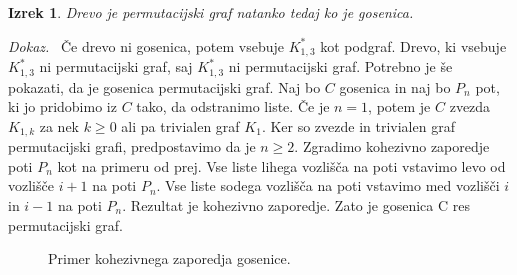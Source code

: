 \documentclass[a4paper, 12pt]{book}
\newtheorem{izrek}{Izrek}[chapter]
\newenvironment{dokaz}{\emph{Dokaz.}\ }{\hspace{\fill}{$\Box$}}
\begin{document}
\begin{izrek}
\label{izrek_gosenica_permutacijski_graf}
    Drevo je permutacijski graf natanko tedaj ko je gosenica.
\end{izrek}
\begin{dokaz}
    Če drevo ni gosenica, potem vsebuje $K_{1,3}^*$ kot podgraf. Drevo, ki vsebuje $K_{1,3}^*$ ni permutacijski graf, saj $K_{1,3}^*$ ni permutacijski graf. Potrebno je še pokazati, da je gosenica permutacijski graf. Naj bo $C$ gosenica in naj bo $P_n$ pot, ki jo pridobimo iz $C$ tako, da odstranimo liste. Če je $n=1$, potem je $C$ zvezda $K_{1,k}$ za nek $k \geq 0$ ali pa trivialen graf $K_1$. Ker so zvezde in trivialen graf permutacijski grafi, predpostavimo da je $n \geq 2$. Zgradimo kohezivno zaporedje poti $P_n$ kot na primeru od prej. Vse liste lihega vozlišča na poti vstavimo levo od vozlišče $i+1$ na poti $P_n$. Vse liste sodega vozlišča na poti vstavimo med vozlišči $i$ in $i-1$ na poti $P_n$. Rezultat je kohezivno zaporedje. Zato je gosenica C res permutacijski graf.
    \begin{figure}[h]
        \begin{center}        
        \end{center}
        \caption{Primer kohezivnega zaporedja gosenice.}
        \label{graf_kohezivnega_zaporedja_gosenice}
    \end{figure}
\end{dokaz}
\end{document}
